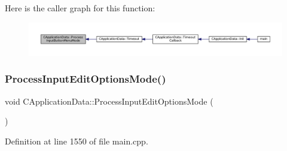 Here is the caller graph for this function\+:
\nopagebreak
\begin{figure}[H]
\begin{center}
\leavevmode
\includegraphics[width=350pt]{classCApplicationData_a10e56e4604f1f0823af659a7989fea9d_icgraph}
\end{center}
\end{figure}
\hypertarget{classCApplicationData_a345f47a19a5abcc9aeeb6b02b4aaf31b}{}\label{classCApplicationData_a345f47a19a5abcc9aeeb6b02b4aaf31b} 
\subsubsection{\texorpdfstring{Process\+Input\+Edit\+Options\+Mode()}{ProcessInputEditOptionsMode()}}
{\footnotesize\ttfamily void C\+Application\+Data\+::\+Process\+Input\+Edit\+Options\+Mode (\begin{DoxyParamCaption}{ }\end{DoxyParamCaption})\hspace{0.3cm}{\ttfamily [protected]}}



Definition at line 1550 of file main.\+cpp.


